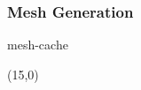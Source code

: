\documentclass[aspectratio=169,table]{beamer}
\begin{document}
\begin{frame}
    \frametitle{Mesh Generation}
    {
        \centering
        \vspace{3em}
        \tikzexternalenable
        {mesh-cache}
        \tikzexternaldisable
    }
    \begin{textblock}{3}(15,0)
    \end{textblock}%
\end{frame}
\end{document}
